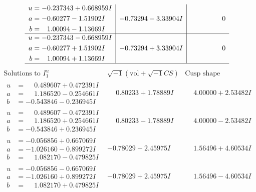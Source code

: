 \documentclass[1p]{elsarticle_modified}
\theoremstyle{definition}
\newcommand{\I}{\sqrt{-1}}
\begin{document}
$$\begin{array}{c|c|c}
\begin{aligned}
u &= -0.237343 + 0.668959 I \\
a &= -0.60277 - 1.51902 I \\
b &= \phantom{-}1.00094 - 1.13669 I\end{aligned}
 & -0.73294 - 3.33904 I & \phantom{-0.000000 } 0 \\ \hline\begin{aligned}
u &= -0.237343 - 0.668959 I \\
a &= -0.60277 + 1.51902 I \\
b &= \phantom{-}1.00094 + 1.13669 I\end{aligned}
 & -0.73294 + 3.33904 I & \phantom{-0.000000 } 0\\
 \hline 
 \end{array}$$\newpage$$\begin{array}{c|c|c}  
\text{Solutions to }I^u_{1}& \I (\text{vol} + \sqrt{-1}CS) & \text{Cusp shape}\\
 \hline 
\begin{aligned}
u &= \phantom{-}0.489607 + 0.472391 I \\
a &= \phantom{-}1.186520 - 0.254661 I \\
b &= -0.543846 - 0.236945 I\end{aligned}
 & \phantom{-}0.80233 + 1.78889 I & \phantom{-}4.00000 + 2.53482 I \\ \hline\begin{aligned}
u &= \phantom{-}0.489607 - 0.472391 I \\
a &= \phantom{-}1.186520 + 0.254661 I \\
b &= -0.543846 + 0.236945 I\end{aligned}
 & \phantom{-}0.80233 - 1.78889 I & \phantom{-}4.00000 - 2.53482 I \\ \hline\begin{aligned}
u &= -0.056856 + 0.667069 I \\
a &= -1.026160 - 0.899272 I \\
b &= \phantom{-}1.082170 - 0.479825 I\end{aligned}
 & -0.78029 - 2.45975 I & \phantom{-}1.56496 + 4.60534 I \\ \hline\begin{aligned}
u &= -0.056856 - 0.667069 I \\
a &= -1.026160 + 0.899272 I \\
b &= \phantom{-}1.082170 + 0.479825 I\end{aligned}
 & -0.78029 + 2.45975 I & \phantom{-}1.56496 - 4.60534 I \\ \hline\begin{aligned}

\end{aligned}
\end{array}$$
\end{document}
